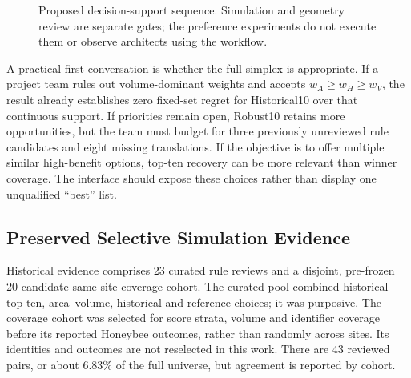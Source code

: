 \documentclass{llncs}
\begin{document}
\begin{figure}[tbp]\centering
{}
\caption{Proposed decision-support sequence. Simulation and geometry review are separate gates; the preference experiments do not execute them or observe architects using the workflow.}\label{fig:workflow}\end{figure}

A practical first conversation is whether the full simplex is appropriate. If a project team rules out volume-dominant weights and accepts $w_A\geq w_H\geq w_V$, the result already establishes zero fixed-set regret for Historical10 over that continuous support. If priorities remain open, Robust10 retains more opportunities, but the team must budget for three previously unreviewed rule candidates and eight missing translations. If the objective is to offer multiple similar high-benefit options, top-ten recovery can be more relevant than winner coverage. The interface should expose these choices rather than display one unqualified ``best'' list.

\subsection{Preserved Selective Simulation Evidence}
Historical evidence comprises 23 curated rule reviews and a disjoint, pre-frozen 20-candidate same-site coverage cohort. The curated pool combined historical top-ten, area--volume, historical and reference choices; it was purposive. The coverage cohort was selected for score strata, volume and identifier coverage before its reported Honeybee outcomes, rather than randomly across sites. Its identities and outcomes are not reselected in this work. There are 43 reviewed pairs, or about 6.83\% of the full universe, but agreement is reported by cohort.
\end{document}
